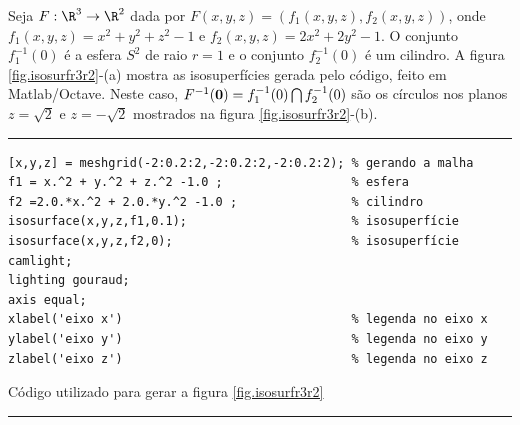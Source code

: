  Seja $F:\R^3 \rightarrow \R^2$ dada por $F(x,y,z) = (f_1(x,y,z),f_2(x,y,z))$, onde $f_1(x,y,z)= x^2 + y^2 + z^2 - 1$ e $f_2(x,y,z)= 2x^2 + 2y^2 - 1$.
O conjunto $f_1^{-1}(0)$ é a esfera {$S^2$} de raio $r=1$ e o conjunto $f_2^{-1}(0)$ é um cilindro. 
A figura \ref{fig.isosurfr3r2}-(a) mostra as isosuperfícies gerada pelo código, feito em Matlab/Octave. Neste caso, $F^{-1}({\bf 0})=f_1^{-1}(0)\bigcap f_2^{-1}(0)$ são os círculos nos planos $z=\sqrt{2}$ e $z=-\sqrt{2}$ mostrados na figura \ref{fig.isosurfr3r2}-(b). 

\begin{Codigo}[htpb]
\noindent\rule{13cm}{1.pt}
\begin{verbatim}
[x,y,z] = meshgrid(-2:0.2:2,-2:0.2:2,-2:0.2:2); % gerando a malha
f1 = x.^2 + y.^2 + z.^2 -1.0 ;                  % esfera
f2 =2.0.*x.^2 + 2.0.*y.^2 -1.0 ;                % cilindro                        
isosurface(x,y,z,f1,0.1);                       % isosuperfície
isosurface(x,y,z,f2,0);                         % isosuperfície
camlight;
lighting gouraud;
axis equal;
xlabel('eixo x')                                % legenda no eixo x
ylabel('eixo y')                                % legenda no eixo y
zlabel('eixo z')                                % legenda no eixo z
\end{verbatim}
\caption{Código utilizado para gerar a figura \ref{fig.isosurfr3r2}} 
\noindent\rule{13cm}{1.pt}
\label{isosurfr3r2}
\end{Codigo}



